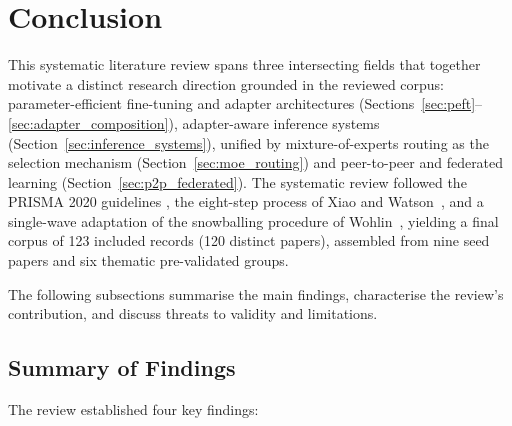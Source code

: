 \section{Conclusion}
\label{sec:conclusion}

This systematic literature review spans three intersecting fields
that together motivate a distinct research direction grounded in the reviewed
corpus: parameter-efficient fine-tuning
and adapter architectures (Sections~\ref{sec:peft}--\ref{sec:adapter_composition}),
adapter-aware inference systems (Section~\ref{sec:inference_systems}), unified by
mixture-of-experts routing as the selection mechanism (Section~\ref{sec:moe_routing}) and
peer-to-peer and federated learning (Section~\ref{sec:p2p_federated}).
The systematic review followed the PRISMA 2020 guidelines \cite{Page2021}, the
eight-step process of Xiao and Watson~\cite{XiaoWatson2019}, and a single-wave
adaptation of the snowballing procedure of
Wohlin~\cite{Wohlin2014}, yielding a final corpus of 123 included
records (120 distinct papers), assembled from nine seed papers and six
thematic pre-validated groups.

The following subsections summarise the main findings, characterise the review's contribution, and discuss threats to validity and limitations.

\subsection{Summary of Findings}
\label{sec:conclusion:summary}

The review established four key findings:

